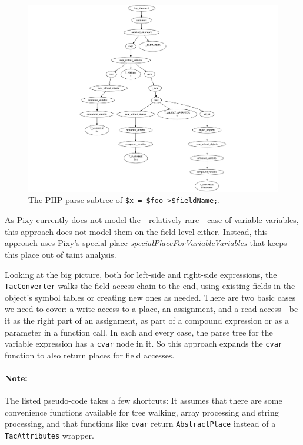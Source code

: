 \begin{figure}[htb]
  \begin{center}
    \includegraphics[trim = 40mm 0mm 0mm 20mm, scale=0.8]{images/variable-field-access-right}
   \caption{The PHP parse subtree of \texttt{\$x = \$foo->\$fieldName;}.}
   \label{fig:variable-field-access-right}
  \end{center}
\end{figure}

As Pixy currently does not model the---relatively rare---case of variable variables, this approach does not model them on the field level either. Instead, this approach uses Pixy's special place \emph{specialPlaceForVariableVariables} that keeps this place out of taint analysis.

Looking at the big picture, both for left-side and right-side expressions, the \texttt{TacConverter} walks the field access chain to the end, using existing fields in the object's symbol tables or creating new ones as needed. There are two basic cases we need to cover: a write access to a place, \ie an assignment, and a read access---be it as the right part of an assignment, as part of a compound expression or as a parameter in a function call. In each and every case, the parse tree for the variable expression has a \texttt{cvar} node in it. So this approach expands the \texttt{cvar} function to also return places for field accesses.

\paragraph{Note:} The listed pseudo-code takes a few shortcuts: It assumes that there are some convenience functions available for tree walking, array processing and string processing, and that functions like \texttt{cvar} return \texttt{AbstractPlace} instead of a \texttt{TacAttributes} wrapper.

